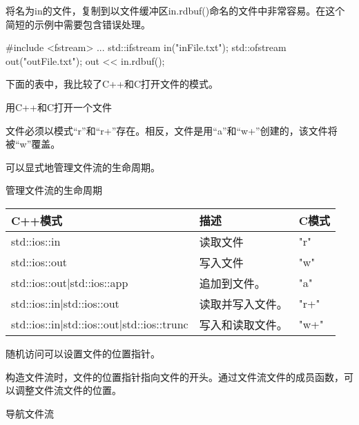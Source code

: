 将名为in的文件，复制到以文件缓冲区in.rdbuf()命名的文件中非常容易。在这个简短的示例中需要包含错误处理。

\begin{cpp}
#include <fstream>
...
std::ifstream in("inFile.txt");
std::ofstream out("outFile.txt");
out << in.rdbuf();
\end{cpp}

下面的表中，我比较了C++和C打开文件的模式。

\begin{center}
用C++和C打开一个文件
\end{center}

文件必须以模式“r”和“r+”存在。相反，文件是用“a”和“w+”创建的，该文件将被“w”覆盖。

可以显式地管理文件流的生命周期。

\begin{center}
管理文件流的生命周期
\end{center}

\begin{longtable}[c]{|l|l|l|}
\hline
\textbf{C++模式}                          & \textbf{描述}        & \textbf{C模式} \\ \hline
\endfirsthead
%
\endhead
%
std::ios::in                               & 读取文件            & "r"             \\ \hline
std::ios::out                              & 写入文件            & "w"             \\ \hline
std::ios::out|std::ios::app                & 追加到文件。       & "a"             \\ \hline
std::ios::in|std::ios::out                 & 读取并写入文件。 & "r+"            \\ \hline
std::ios::in|std::ios::out|std::ios::trunc &写入和读取文件。 & "w+"            \\ \hline
\end{longtable}


随机访问可以设置文件的位置指针。

构造文件流时，文件的位置指针指向文件的开头。通过文件流文件的成员函数，可以调整文件流文件的位置。

\begin{center}
导航文件流
\end{center}

